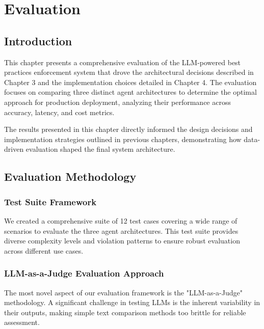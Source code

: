 
\setcounter{chapter}{4}
\chapter{Evaluation}
\minitoc %
\graphicspath{{Chapitre5/figures/}}

\pagestyle{fancy}
\fancyhf{}
\fancyhead[R]{\bfseries\rightmark}
\fancyfoot[R]{\thepage}
\renewcommand{\headrulewidth}{0.5pt}
\renewcommand{\footrulewidth}{0pt}
\renewcommand{\chaptermark}[1]{\markboth{{\chaptername~\thechapter. #1 }}{}}
\renewcommand{\sectionmark}[1]{\markright{\thechapter.\thesection~ #1}}

\begin{spacing}{1.2}

\section*{Introduction}
This chapter presents a comprehensive evaluation of the LLM-powered best practices enforcement system that drove the architectural decisions described in Chapter 3 and the implementation choices detailed in Chapter 4. The evaluation focuses on comparing three distinct agent architectures to determine the optimal approach for production deployment, analyzing their performance across accuracy, latency, and cost metrics.

The results presented in this chapter directly informed the design decisions and implementation strategies outlined in previous chapters, demonstrating how data-driven evaluation shaped the final system architecture.

\section{Evaluation Methodology}

\subsection{Test Suite Framework}
We created a comprehensive suite of 12 test cases covering a wide range of scenarios to evaluate the three agent architectures. This test suite provides diverse complexity levels and violation patterns to ensure robust evaluation across different use cases.

\subsection{LLM-as-a-Judge Evaluation Approach}
The most novel aspect of our evaluation framework is the "LLM-as-a-Judge" methodology. A significant challenge in testing LLMs is the inherent variability in their outputs, making simple text comparison methods too brittle for reliable assessment.


\end{spacing}
